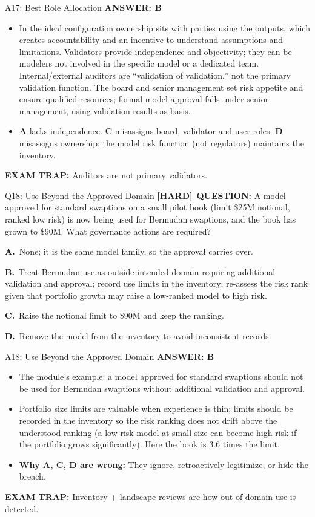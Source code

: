 \documentclass[8pt]{beamer}
\newcommand{\fs}{\fontsize{10}{12}\selectfont}
\newcommand{\opts}[4]{\par\vspace{0.12cm}\noindent\textbf{A.}~#1\par\vspace{0.08cm}\noindent\textbf{B.}~#2\par\vspace{0.08cm}\noindent\textbf{C.}~#3\par\vspace{0.08cm}\noindent\textbf{D.}~#4\par}
\newcommand{\ans}[1]{\textcolor{myblue}{\textbf{ANSWER: #1}}}
\newcommand{\trap}[1]{\textcolor{myred}{\textbf{EXAM TRAP:}} #1}
\newcommand{\hard}{\textcolor{myorange}{\textbf{[HARD]}}}
\begin{document}
\begin{frame}[t]{A17: Best Role Allocation}
\fs
\ans{B}
\begin{itemize}
\item In the ideal configuration ownership sits with parties using the outputs, which creates accountability and an incentive to understand assumptions and limitations. Validators provide independence and objectivity; they can be modelers not involved in the specific model or a dedicated team. Internal/external auditors are ``validation of validation,'' not the primary validation function. The board and senior management set risk appetite and ensure qualified resources; formal model approval falls under senior management, using validation results as basis.
\item \textbf{A} lacks independence. \textbf{C} misassigns board, validator and user roles. \textbf{D} misassigns ownership; the model risk function (not regulators) maintains the inventory.
\end{itemize}
\trap{Auditors are \textcolor{myblue}{not} primary validators.}
\end{frame}

\begin{frame}[t]{Q18: Use Beyond the Approved Domain}
\fs
\hard\ \textbf{QUESTION:} A model approved for standard swaptions on a small pilot book (limit \$25M notional, ranked low risk) is now being used for Bermudan swaptions, and the book has grown to \$90M. What governance actions are required?
\opts{None; it is the same model family, so the approval carries over.}
{Treat Bermudan use as outside intended domain requiring additional validation and approval; record use limits in the inventory; re-assess the risk rank given that portfolio growth may raise a low-ranked model to high risk.}
{Raise the notional limit to \$90M and keep the ranking.}
{Remove the model from the inventory to avoid inconsistent records.}
\end{frame}

\begin{frame}[t]{A18: Use Beyond the Approved Domain}
\fs
\ans{B}
\begin{itemize}
\item The module's example: a model approved for standard swaptions should not be used for Bermudan swaptions without additional validation and approval.
\item Portfolio size limits are valuable when experience is thin; limits should be recorded in the inventory so the risk ranking does not drift above the understood ranking (a low-risk model at small size can become high risk if the portfolio grows significantly). Here the book is 3.6 times the limit.
\item \textbf{Why A, C, D are wrong:} They ignore, retroactively legitimize, or hide the breach.
\end{itemize}
\trap{Inventory + landscape reviews are how \textcolor{myblue}{out-of-domain use} is detected.}
\end{frame}
\end{document}
